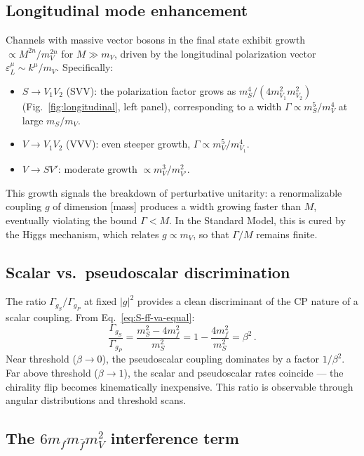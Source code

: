 \documentclass[11pt,a4paper]{article}
\newcommand{\beq}{\begin{equation}}
\newcommand{\eeq}{\end{equation}}
\begin{document}
\subsection{Longitudinal mode enhancement}

Channels with massive vector bosons in the final state exhibit growth $\propto M^{2n}/m_V^{2n}$
for $M \gg m_V$, driven by the longitudinal polarization vector $\varepsilon_L^\mu \sim k^\mu/m_V$.
Specifically:

\begin{itemize}
\item $S\to V_1V_2$ (SVV): the polarization factor grows as $m_S^4/(4m_{V_1}^2 m_{V_2}^2)$
  (Fig.~\ref{fig:longitudinal}, left panel), corresponding to a width $\Gamma \propto m_S^5/m_V^4$
  at large $m_S/m_V$.

\item $V\to V_1V_2$ (VVV): even steeper growth, $\Gamma \propto m_V^5/m_{V_1}^4$.

\item $V\to SV'$: moderate growth $\propto m_V^3/m_{V'}^2$.
\end{itemize}

This growth signals the breakdown of perturbative unitarity: a renormalizable coupling $g$ of
dimension [mass] produces a width growing faster than $M$, eventually violating the bound
$\Gamma < M$. In the Standard Model, this is cured by the Higgs mechanism, which relates
$g \propto m_V$, so that $\Gamma/M$ remains finite.

\subsection{Scalar vs.\ pseudoscalar discrimination}

The ratio $\Gamma_{g_S}/\Gamma_{g_P}$ at fixed $|g|^2$ provides a clean discriminant of the
CP nature of a scalar coupling. From Eq.~\eqref{eq:S-ff-va-equal}:
\beq
\frac{\Gamma_{g_S}}{\Gamma_{g_P}} = \frac{m_S^2-4m_f^2}{m_S^2} = 1 - \frac{4m_f^2}{m_S^2} = \beta^2\,.
\eeq
Near threshold ($\beta\to 0$), the pseudoscalar coupling dominates by a factor $1/\beta^2$.
Far above threshold ($\beta\to 1$), the scalar and pseudoscalar rates coincide --- the chirality
flip becomes kinematically inexpensive. This ratio is observable through angular distributions
and threshold scans.

\subsection{The $6m_f m_{\bar{f}} m_V^2$ interference term}
\end{document}
